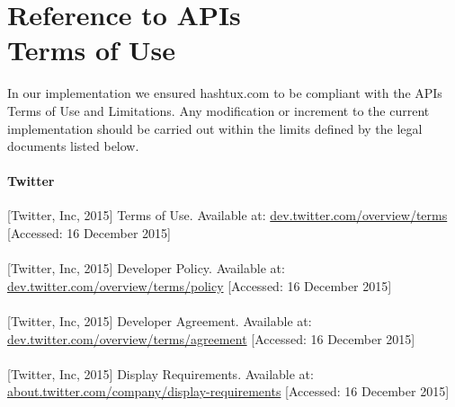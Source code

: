 \label{appendix}
\appendix

\hypertarget{appb}{
\chapter[Reference to APIs Terms of Use]{Reference to APIs\\ Terms of Use}}
In our implementation we ensured hashtux.com to be compliant with the APIs Terms
of Use and Limitations. Any modification or increment to the current
implementation should be carried out within the limits defined by the legal
documents listed below.

\subsubsection{Twitter}
{[Twitter, Inc, 2015]} Terms of Use. \newline
Available at: \href{https://dev.twitter.com/overview/terms}
   {dev.twitter.com/overview/terms} \newline
{[Accessed: 16 December 2015]} \\ \\
{[Twitter, Inc, 2015]} Developer Policy. \newline
Available at: \href{https://dev.twitter.com/overview/terms/policy}
   {dev.twitter.com/overview/terms/policy} \newline
{[Accessed: 16 December 2015]} \\ \\
{[Twitter, Inc, 2015]} Developer Agreement. \newline
Available at: \href{https://dev.twitter.com/overview/terms/agreement}
   {dev.twitter.com/overview/terms/agreement} \newline
{[Accessed: 16 December 2015]} \\ \\
{[Twitter, Inc, 2015]} Display Requirements. \newline
Available at: \href{https://about.twitter.com/company/display-requirements}
   {about.twitter.com/company/display-requirements} \newline
{[Accessed: 16 December 2015]}


